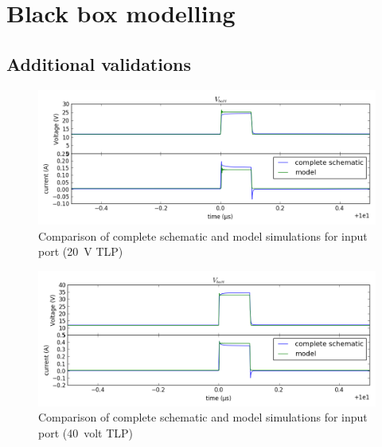 \chapter{Black box modelling}
\section{Additional validations}
\label{apx:black-box-validations}

\begin{figure}[!h]
  \centering
  \includegraphics[width=\textwidth]{src/4/figures/comparison_model_total_20V.png}
  \caption{Comparison of complete schematic and model simulations for input port (\SI{20}{\volt} TLP)}
  \label{fig:compare-model-simu-20}
\end{figure}

\begin{figure}[!h]
  \centering
  \includegraphics[width=\textwidth]{src/4/figures/comparison_model_total_40V.png}
  \caption{Comparison of complete schematic and model simulations for input port (\SI{40}{volt} TLP)}
  \label{fig:compare-model-simu-40}
\end{figure}
